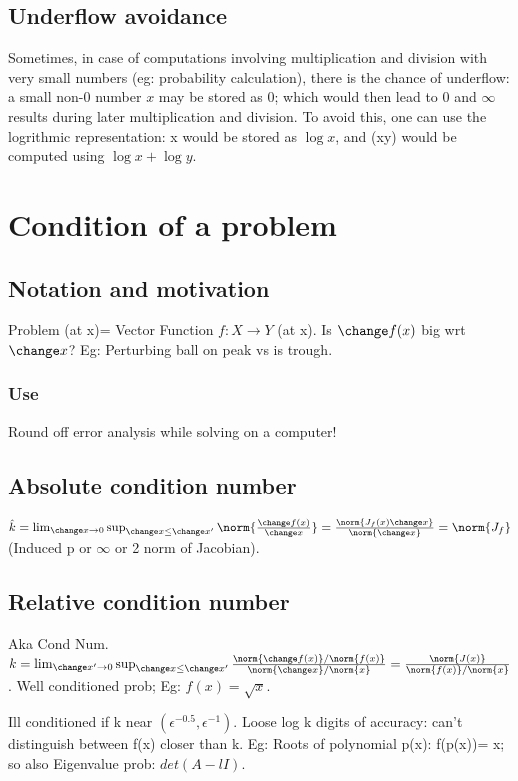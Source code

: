 \documentclass[oneside, article]{memoir}
\begin{document}
\section{Underflow avoidance}
Sometimes, in case of computations involving multiplication and division with very small numbers (eg: probability calculation), there is the chance of underflow: a small non-0 number $x$ may be stored as 0; which would then lead to $0$ and $\infty$ results during later multiplication and division. To avoid this, one can use the logrithmic representation: x would be stored as $\log x$, and (xy) would be computed using $\log x + \log y$.

\chapter{Condition of a problem}
\section{Notation and motivation}
Problem (at x)= Vector Function $f:X \to Y$ (at x). Is $\change f(x)$ big wrt $\change x$? Eg: Perturbing ball on peak vs is trough.

\subsection{Use}
Round off error analysis while solving on a computer!

\section{Absolute condition number}
$\hat{k} = \lim_{\change x\to 0} \sup_{\change x \leq \change x'} \norm{\frac{\change f(x)}{\change x}} \\
= \frac{\norm{J_{f}(x) \change x}}{\norm{\change x}} = \norm{J_{f}}$ (Induced p or $\infty$ or 2 norm of Jacobian).

\section{Relative condition number}
Aka Cond Num.\\
$k = \lim_{\change x' \to 0} \sup_{\change x \leq \change x'} \frac{\norm{\change f(x)}/\norm{f(x)}}{\norm{\change x}/ \norm{x}} = \frac{\norm{J(x)}}{\norm{f(x)}/\norm{x}}$. Well conditioned prob; Eg: $f(x) = \sqrt{x}$.

Ill conditioned if k near $(\epsilon^{-0.5}, \epsilon^{-1})$. Loose log k digits of accuracy: can't distinguish between f(x) closer than k. Eg: Roots of polynomial p(x): f(p(x))= x; so also Eigenvalue prob: $det(A-lI)$.
\end{document}
